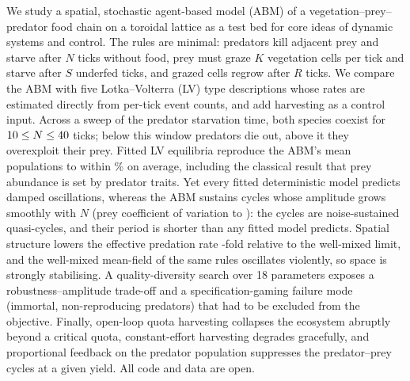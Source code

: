 We study a spatial, stochastic agent-based model (ABM) of a vegetation--prey--predator food chain on a
toroidal lattice as a test bed for core ideas of dynamic systems and control. The rules are minimal:
predators kill adjacent prey and starve after $N$ ticks without food, prey must graze $K$ vegetation cells
per tick and starve after $S$ underfed ticks, and grazed cells regrow after $R$ ticks. We compare the ABM
with five Lotka--Volterra (LV) type descriptions whose rates are estimated directly from per-tick event
counts, and add harvesting as a control input. Across a sweep of the predator starvation time, both
species coexist for $10 \le N \le 40$ ticks; below this window predators die out, above it they
overexploit their prey. Fitted LV equilibria reproduce the ABM's mean populations to within
\EqErrMean\% on average, including the classical result that prey abundance is set by predator traits.
Yet every fitted deterministic model predicts damped oscillations, whereas the ABM sustains cycles whose
amplitude grows smoothly with $N$ (prey coefficient of variation \CVlow{} to \CVhigh{}): the cycles are
noise-sustained quasi-cycles, and their period is shorter than any fitted model predicts. Spatial structure
lowers the effective predation rate \bRatio-fold relative to the well-mixed limit, and the well-mixed
mean-field of the same rules oscillates violently, so space is strongly stabilising. A quality-diversity
search over 18 parameters exposes a robustness--amplitude trade-off and a specification-gaming failure
mode (immortal, non-reproducing predators) that had to be excluded from the objective. Finally,
open-loop quota harvesting collapses the ecosystem abruptly beyond a critical quota, constant-effort
harvesting degrades gracefully, and proportional feedback on the predator population suppresses the
predator--prey cycles at a given yield. All code and data are open.
